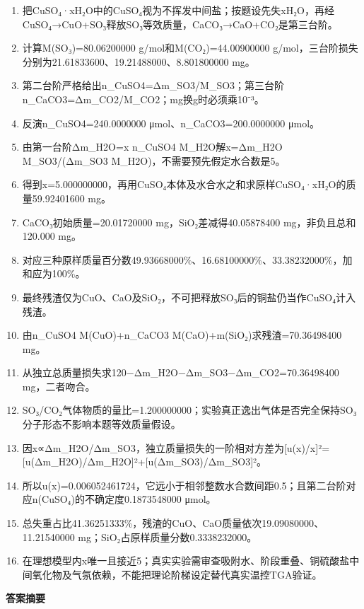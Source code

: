 \documentclass[UTF8,11pt,a4paper]{ctexart}
\begin{document}
\begin{enumerate}
\item 把CuSO₄·xH₂O中的CuSO₄视为不挥发中间盐；按题设先失xH₂O，再经CuSO₄→CuO+SO₃释放SO₃等效质量，CaCO₃→CaO+CO₂是第三台阶。
\item 计算M(SO₃)=80.06200000 g/mol和M(CO₂)=44.00900000 g/mol，三台阶损失分别为21.61833600、19.21488000、8.801800000 mg。
\item 第二台阶严格给出n\_CuSO4=Δm\_SO3/M\_SO3；第三台阶n\_CaCO3=Δm\_CO2/M\_CO2；mg换g时必须乘10⁻³。
\item 反演n\_CuSO4=240.0000000 μmol、n\_CaCO3=200.0000000 μmol。
\item 由第一台阶Δm\_H2O=x n\_CuSO4 M\_H2O解x=Δm\_H2O M\_SO3/(Δm\_SO3 M\_H2O)，不需要预先假定水合数是5。
\item 得到x=5.000000000，再用CuSO₄本体及水合水之和求原样CuSO₄·xH₂O的质量59.92401600 mg。
\item CaCO₃初始质量=20.01720000 mg，SiO₂差减得40.05878400 mg，非负且总和120.000 mg。
\item 对应三种原样质量百分数49.93668000\%、16.68100000\%、33.38232000\%，加和应为100\%。
\item 最终残渣仅为CuO、CaO及SiO₂，不可把释放SO₃后的铜盐仍当作CuSO₄计入残渣。
\item 由n\_CuSO4 M(CuO)+n\_CaCO3 M(CaO)+m(SiO₂)求残渣=70.36498400 mg。
\item 从独立总质量损失求120−Δm\_H2O−Δm\_SO3−Δm\_CO2=70.36498400 mg，二者吻合。
\item SO₃/CO₂气体物质的量比=1.200000000；实验真正逸出气体是否完全保持SO₃分子形态不影响本题等效质量假设。
\item 因x∝Δm\_H2O/Δm\_SO3，独立质量损失的一阶相对方差为[u(x)/x]²=[u(Δm\_H2O)/Δm\_H2O]²+[u(Δm\_SO3)/Δm\_SO3]²。
\item 所以u(x)=0.006052461724，它远小于相邻整数水合数间距0.5；且第二台阶对应n(CuSO₄)的不确定度0.1873548000 μmol。
\item 总失重占比41.36251333\%，残渣的CuO、CaO质量依次19.09080000、11.21540000 mg；SiO₂占原样质量分数0.3338232000。
\item 在理想模型内x唯一且接近5；真实实验需审查吸附水、阶段重叠、铜硫酸盐中间氧化物及气氛依赖，不能把理论阶梯设定替代真实温控TGA验证。
\end{enumerate}
\noindent\textbf{答案摘要}\par
\end{document}
